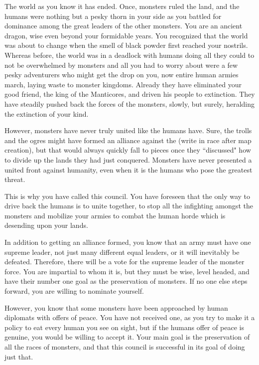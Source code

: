 \documentclass[char]{guildcamp2}
\begin{document}
\name{\cOnyx{}}


	The world as you know it has ended. Once, monsters ruled the land, and the humans were nothing but a pesky thorn in your side as you battled for dominance among the great leaders of the other monsters. You are an ancient dragon, wise even beyond your formidable years. You recognized that the world was about to change when the smell of black powder first reached your nostrils. Whereas before, the world was in a deadlock with humans doing all they could to not be overwhelmed by monsters and all you had to worry about were a few pesky adventurers who might get the drop on you, now entire human armies march, laying waste to monster kingdoms. Already they have eliminated your good friend, the king of the Manticores, and driven his people to extinction. They have steadily pushed back the forces of the monsters, slowly, but surely, heralding the extinction of your kind. 
	
	However, monsters have never truly united like the humans have. Sure, the trolls and the ogres might have formed an alliance against the (write in race after map creation), but that would always quickly fall to pieces once they ``discussed" how to divide up the lands they had just conquered. Monsters have never presented a united front against humanity, even when it is the humans who pose the greatest threat. 
	
	This is why you have called this council. You have foreseen that the only way to drive back the humans is to unite together, to stop all the infighting amongst the monsters and mobilize your armies to combat the human horde which is desending upon your lands.  
	
	In addition to getting an alliance formed, you  know that an army must have one supreme leader, not just many different equal leaders, or it will inevitably be defeated. Therefore, there will be a vote for the supreme leader of the monster force. You are impartial to whom it is, but they must be wise, level headed, and have their number one goal as the preservation of monsters. If no one else steps forward, you are willing to nominate yourself.
	
	However, you know that some monsters have been approached by human diplomats with offers of peace. You have not received one, as you try to make it a policy to eat every human you see on sight, but if the humans offer of peace is genuine, you would be willing to accept it. Your main goal is the preservation of all the races of monsters, and that this council is successful in its goal of doing just that.
	
\end{document}
